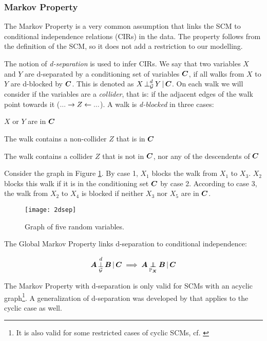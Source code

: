 \subsubsection{Markov Property}
The Markov Property is a very common assumption that links the SCM to conditional independence relations (CIRs) in the data. The property follows from the definition of the SCM, so it does not add a restriction to our modelling. 

The notion of \textit{d-separation} is used to infer CIRs. We say that two variables $X$ and $Y$ are d-separated by a conditioning set of variables $\B{C}$, if all walks from $X$ to $Y$ are d-blocked by $\B{C}$. This is denoted as $\dsep{X}{Y}{\B{C}}{\C{G}}$. On each walk we will consider if the variables are a \textit{collider}, that is: if the adjacent edges of the walk point towards it ($...\to Z \ot ...$). A walk is \textit{d-blocked} in three cases:

\begin{compactenum}
    \item $X$ or $Y$ are in $\B{C}$
    \item The walk contains a non-collider $Z$ that is in $\B{C}$
    \item The walk contains a collider $Z$ that is not in $\B{C}$, nor any of the descendents of $\B{C}$
\end{compactenum}

Consider the graph in Figure \ref{fig:2:dsep}. By case 1, $X_1$ blocks the walk from $X_1$ to $X_3$. $X_2$ blocks this walk if it is in the conditioning set $\B{C}$ by case 2. According to case 3, the walk from $X_2$ to $X_4$ is blocked if neither $X_3$ nor $X_5$ are in $\B{C}$.

\begin{figure}[h]
    \centering
    \texttt{[image: 2dsep]}
    \caption{Graph of five random variables.}
    \label{fig:2:dsep}
\end{figure}

The Global Markov Property links d-separation to conditional independence:

$$\dsep{\B{A}}{\B{B}}{\B{C}}{\C{G}} \implies \indep{\B{A}}{\B{B}}{\B{C}}{\Prb_{\B{X}}}$$

The Markov Property with d-separation is only valid for SCMs with an acyclic graph\footnote{It is also valid for some restricted cases of cyclic SCMs, cf. \citet{forre2017markov}}. A generalization of d-separation was developed by \citet{forre2017markov} that applies to the cyclic case as well.

